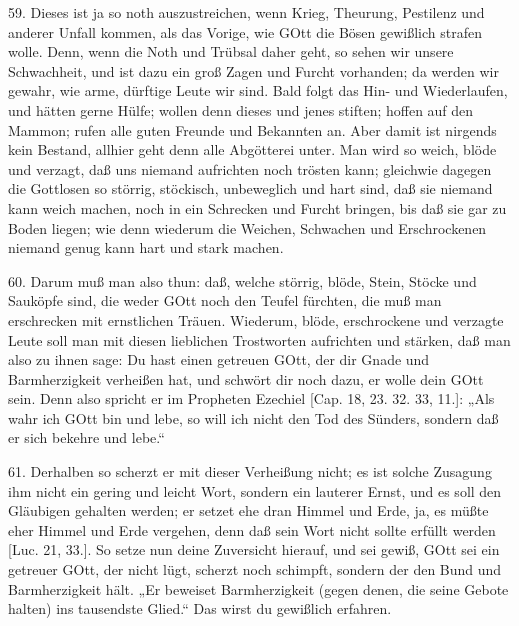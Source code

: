 59. Dieses ist ja so noth auszustreichen, wenn Krieg, Theurung, Pestilenz und anderer Unfall kommen, als das Vorige, wie GOtt die Bösen gewißlich strafen wolle. Denn, wenn die Noth und Trübsal daher geht, so sehen wir unsere Schwachheit, und ist dazu ein groß Zagen und Furcht vorhanden; da werden wir gewahr, wie arme, dürftige Leute wir sind. Bald folgt das Hin- und Wiederlaufen, und hätten gerne Hülfe; wollen denn dieses und jenes stiften; hoffen auf den Mammon; rufen alle guten Freunde und Bekannten an. Aber damit ist nirgends kein Bestand, allhier geht denn alle Abgötterei unter. Man wird so weich, blöde und verzagt, daß uns niemand aufrichten noch trösten kann; gleichwie dagegen die Gottlosen so störrig, stöckisch, unbeweglich und hart sind, daß sie niemand kann weich machen, noch in ein Schrecken und Furcht bringen, bis daß sie gar zu Boden liegen; wie denn wiederum die Weichen, Schwachen und Erschrockenen niemand genug kann hart und stark machen.

60. Darum muß man also thun: daß, welche störrig, blöde, Stein, Stöcke und Sauköpfe sind, die weder GOtt noch den Teufel fürchten, die muß man erschrecken mit ernstlichen Träuen. Wiederum, blöde, erschrockene und verzagte Leute soll man mit diesen lieblichen Trostworten aufrichten und stärken, daß man also zu ihnen sage: Du hast einen getreuen GOtt, der dir Gnade und Barmherzigkeit verheißen hat, und schwört dir noch dazu, er wolle dein GOtt sein. Denn also spricht er im Propheten Ezechiel [Cap. 18, 23. 32. 33, 11.]: „Als wahr ich GOtt bin und lebe, so will ich nicht den Tod des Sünders, sondern daß er sich bekehre und lebe.“

61. Derhalben so scherzt er mit dieser Verheißung nicht; es ist solche Zusagung ihm nicht ein gering und leicht Wort, sondern ein lauterer Ernst, und es soll den Gläubigen gehalten werden; er setzet ehe dran Himmel und Erde, ja, es müßte eher Himmel und Erde vergehen, denn daß sein Wort nicht sollte erfüllt werden [Luc. 21, 33.]. So setze nun deine Zuversicht hierauf, und sei gewiß, GOtt sei ein getreuer GOtt, der nicht lügt, scherzt noch schimpft, sondern der den Bund und Barmherzigkeit hält. „Er beweiset Barmherzigkeit (gegen denen, die seine Gebote halten) ins tausendste Glied.“ Das wirst du gewißlich erfahren.

